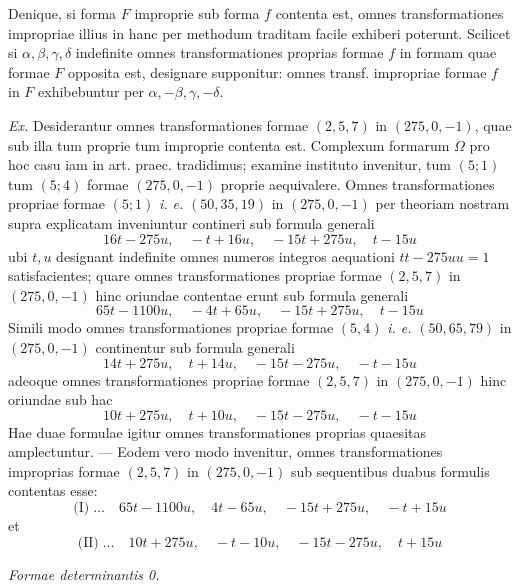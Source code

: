 Denique, si forma $F$ improprie sub forma $f$ contenta est, omnes transformationes impropriae illius in hanc per methodum traditam facile exhiberi poterunt. Scilicet si $\alpha,\beta,\gamma,\delta$ indefinite omnes transformationes proprias formae $f$ in formam quae formae $F$ opposita est, designare supponitur: omnes transf. impropriae formae $f$ in $F$ exhibebuntur per $\alpha,-\beta,\gamma,-\delta$.

\textit{Ex.} Desiderantur omnes transformationes formae $(2,5,7)$ in $(275,0,-1)$, quae sub illa tum proprie tum improprie contenta est. Complexum formarum $\Omega$ pro hoc casu iam in art. praec. tradidimus; examine instituto invenitur, tum $(5;1)$ tum $(5;4)$ formae $(275,0,-1)$ proprie aequivalere. Omnes transformationes propriae formae $(5;1)$ \textit{i. e.} $(50,35,19)$ in $(275,0,-1)$ per theoriam nostram supra explicatam inveniuntur contineri sub formula generali
\[
16t-275u,\quad -t+16u,\quad -15t+275u,\quad t-15u
\]
ubi $t,u$ designant indefinite omnes numeros integros aequationi $tt-275uu=1$
satisfacientes; quare omnes transformationes propriae formae $(2,5,7)$ in $(275,0,-1)$ hinc oriundae contentae erunt sub formula generali
\[
65t-1100u,\quad -4t+65u,\quad -15t+275u,\quad t-15u
\]
Simili modo omnes transformationes propriae formae $(5,4)$ \textit{i. e.} $(50,65,79)$ in $(275,0,-1)$ continentur sub formula generali
\[
14t+275u,\quad t+14u,\quad -15t-275u,\quad -t-15u
\]
adeoque omnes transformationes propriae formae $(2,5,7)$ in $(275,0,-1)$ hinc oriundae sub hac
\[
10t+275u,\quad t+10u,\quad -15t-275u,\quad -t-15u
\]
Hae duae formulae igitur omnes transformationes proprias quaesitas amplectuntur. --- Eodem vero modo invenitur, omnes transformationes improprias formae $(2,5,7)$ in $(275,0,-1)$ sub sequentibus duabus formulis contentas esse:
\[
\text{(I)}\;\ldots\quad 65t-1100u,\quad 4t-65u,\quad -15t+275u,\quad -t+15u
\]
et
\[
\text{(II)}\;\ldots\quad 10t+275u,\quad -t-10u,\quad -15t-275u,\quad t+15u
\]

\begin{center}
\textit{Formae determinantis 0.}
\end{center}

